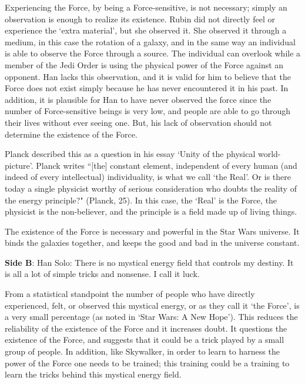 \documentclass[11pt, oneside]{article}
\begin{document}
\par Experiencing the Force, by being a Force-sensitive, is not necessary; simply an observation is enough to realize its existence. Rubin did not directly feel or experience the `extra material', but she observed it. She observed it through a medium, in this case the rotation of a galaxy, and in the same way an individual is able to observe the Force through a source. The individual can overlook while a member of the Jedi Order is using the physical power of the Force against an opponent. Han lacks this observation, and it is valid for him to believe that the Force does not exist simply because he has never encountered it in his past. In addition, it is plausible for Han to have never observed the force since the number of Force-sensitive beings is very low, and people are able to go through their lives without ever seeing one. But, his lack of observation should not determine the existence of the Force.

\par Planck described this as a question in his essay `Unity of the physical world-picture'. Planck writes ``[the] constant element, independent of every human (and indeed of every intellectual) individuality, is what we call `the Real'. Or is there today a single physicist worthy of serious consideration who doubts the reality of the energy principle?" (Planck, 25). In this case, the `Real' is the Force, the physicist is the non-believer, and the principle is a field made up of living things. 

\par The existence of the Force is necessary and powerful in the Star Wars universe. It binds the galaxies together, and keeps the good and bad in the universe constant. 

\newpage 

\noindent \textbf{Side B}: Han Solo: There is no mystical energy field that controls my destiny.  It is all a lot of simple tricks and nonsense. I call it luck. 

\par From a statistical standpoint the number of people who have directly experienced, felt, or observed this mystical energy, or as they call it `the Force', is a very small percentage (as noted in `Star Wars: A New Hope'). This reduces the reliability of the existence of the Force and it increases doubt. It questions the existence of the Force, and suggests that it could be a trick played by a small group of people. In addition, like Skywalker, in order to learn to harness the power of the Force one needs to be trained; this training could be a training to learn the tricks behind this mystical energy field.
\end{document}
